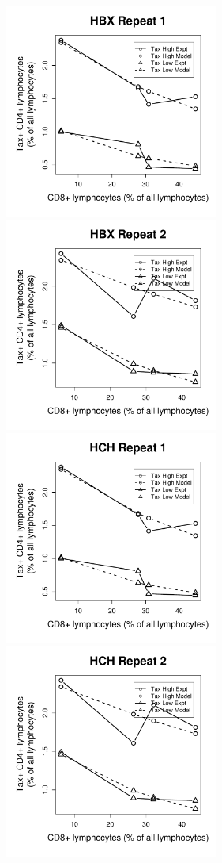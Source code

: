 \begin{figure}[htp]
\centering
\includegraphics[width=7cm]{./Figures/chapter5/figure_lysis_hbx_rep_1}%
\hspace{0cm}%
\includegraphics[width=7cm]{./Figures/chapter5/figure_lysis_hbx_rep_2} \\
\includegraphics[width=7cm]{./Figures/chapter5/figure_lysis_hch_rep_1}%
\hspace{0cm}%
\includegraphics[width=7cm]{./Figures/chapter5/figure_lysis_hch_rep_2} \\

\end{figure}
